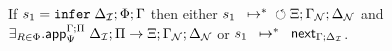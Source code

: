 \iffalse
\begin{theorem}[One rule]\label{thm:one_rule}
If $\transs{\dostate{\Delta}{\Phi}{\Gamma}{\Pi}}{\finalstate{\Xi}{\gammanew}{\deltanew}}$
then $\exists_{R \in \Phi}$ such that
$\transs{\dostate{\Delta}{R}{\Gamma}{\Pi}}{\finalstate{\Xi}{\gammanew}{\deltanew}}$
\end{theorem}
\begin{proof}
Induction on the size of $\Phi$.

Assume $\Phi = A \lolli B, \Phi'$ and $\rulestk = (\Delta; \Phi')$.
Apply two steps to the first state of the assumption to get
$\matstate{A \lolli B}{\rulestk}{\cdot}{\Gamma}{\Delta}{A}{\cdot
   \rightarrow \one}$.

Applying Lemma~\ref{thm:body_match} (LHS match result) leads to two sub-cases:

\begin{itemize}[leftmargin=*]
   \item Match fails: \\
   $\contstate{A \lolli B}{\rulestk}{\cdot}{\Gamma}$ \hfill (1) \\

   $\dostate{\Delta}{\Phi'}{\Gamma}{\Pi}$ \hfill (2) state after (1) \\
   $\transs{\dostate{\Delta}{R'}{\Gamma}{\Pi}}{\finalstate{\Xi}{\gammanew}{\deltanew}}$
   \hfill (3) i.h. on (2) where $R' \in \Phi'$ \\

   \item Match succeeds: \\

   $\matstate{A \lolli B}{\rulestk}{\lstack{C}}{\Gamma}{\Delta_1}{\cdot}{\Delta'
      \rightarrow split(A)}$ \\ \hfill (1) \\
   $\mo \Gamma; \Delta; \cdot; A; B; \cdot; (\cdot, \Delta) \rightarrow \outsem$ \hfill (1)\\
   $\ao \Gamma; \Delta; A \lolli B; (\cdot, \Delta) \rightarrow \outsem$ \hfill (2) rule $\ao \m{rule}$ on (1) \\
   $\doo \Gamma; \Delta; A \lolli B \rightarrow \outsem$ \hfill (3) rule $\doo \m{rule}$ on (2) \\
\end{itemize}
\end{proof}
\fi


\begin{theorem}[Soundness]\label{thm:soundness}
If $s_1 = \dostate{\deltan}{\Phi}{\Gamma}{\Pi}$
then either $\transs{s_1}{\finalstate{\Xi}{\gammanew}{\deltanew}}$
and $\exists_{R \in \Phi}. \az{\Psi}{\Gamma}{\deltan}{\Pi}{R}{\Xi; \gammanew;
      \deltanew}$
or $\transs{s_1}{\failstate{\Gamma}{\deltan}}$.
\end{theorem}

